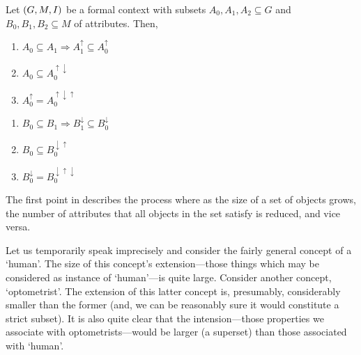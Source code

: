 \begin{proposition}
  \label{proposition:properties-about-derivation-operators}
  Let $(G,M,I)$ be a formal context with subsets $A_0, A_1, A_2 \subseteq G$ and $B_0, B_1, B_2 \subseteq M$ of attributes. Then,
  \vspace{-1em}
  \begin{center}
    \begin{minipage}[t]{0.48\textwidth}
      \begin{enumerate}
        \item $A_0 \subseteq A_1 \Rightarrow A_1^\uparrow \subseteq A_0^\uparrow$
        \item $A_0 \subseteq A_0^{\uparrow \downarrow}$
        \item $A_0^\uparrow = A_0^{\uparrow \downarrow \uparrow}$
      \end{enumerate}
    \end{minipage}%
    \hfill
    \begin{minipage}[t]{0.48\textwidth}
      \begin{enumerate}
        \item $B_0 \subseteq B_1 \Rightarrow B_1^\downarrow \subseteq B_0^\downarrow$
        \item $B_0 \subseteq B_0^{\downarrow \uparrow}$
        \item $B_0^\downarrow = B_0^{\downarrow \uparrow \downarrow}$
      \end{enumerate}
    \end{minipage}
  \end{center}
\end{proposition}

The first point in  describes the process where as the size of a set of objects grows, the number of attributes that all objects in the set satisfy is reduced, and vice versa.

Let us temporarily speak imprecisely and consider the fairly general concept of a `human'. The size of this concept's extension---those things which may be considered as instance of `human'---is quite large. Consider another concept, `optometrist'. The extension of this latter concept is, presumably, considerably smaller than the former (and, we can be reasonably sure it would constitute a strict subset). It is also quite clear that the intension---those properties we associate with optometrists---would be larger (a superset) than those associated with `human'. 

